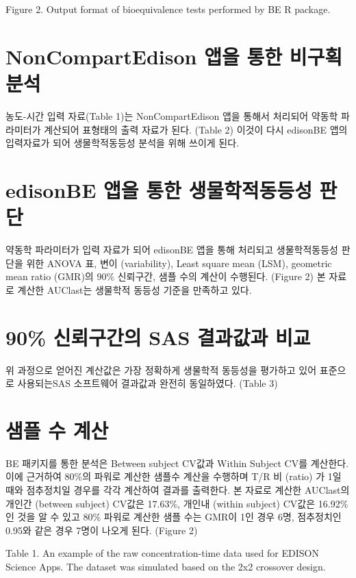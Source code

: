 \documentclass[12pt,]{krantz}
\begin{document}
Figure 2. Output format of bioequivalence tests performed by BE R package.

\hypertarget{noncompartedison---}{%
\section{NonCompartEdison 앱을 통한 비구획분석}\label{noncompartedison---}}

농도-시간 입력 자료(Table 1)는 NonCompartEdison 앱을 통해서 처리되어 약동학 파라미터가 계산되어 표형태의 출력 자료가 된다. (Table 2) 이것이 다시 edisonBE 앱의 입력자료가 되어 생물학적동등성 분석을 위해 쓰이게 된다.

\hypertarget{edisonbe----}{%
\section{edisonBE 앱을 통한 생물학적동등성 판단}\label{edisonbe----}}

약동학 파라미터가 입력 자료가 되어 edisonBE 앱을 통해 처리되고 생물학적동등성 판단을 위한 ANOVA 표, 변이 (variability), Least square mean (LSM), geometric mean ratio (GMR)의 90\% 신뢰구간, 샘플 수의 계산이 수행된다. (Figure 2) 본 자료로 계산한 AUClast는 생물학적 동등성 기준을 만족하고 있다.

\hypertarget{sas--}{%
\section{90\% 신뢰구간의 SAS 결과값과 비교}\label{sas--}}

위 과정으로 얻어진 계산값은 가장 정확하게 생물학적 동등성을 평가하고 있어 표준으로 사용되는SAS 소프트웨어 결과값과 완전히 동일하였다. (Table 3)

\hypertarget{section-3}{%
\section{샘플 수 계산}\label{section-3}}

BE 패키지를 통한 분석은 Between subject CV값과 Within Subject CV를 계산한다. 이에 근거하여 80\%의 파워로 계산한 샘플수 계산을 수행하며 T/R 비 (ratio) 가 1일 때와 점추정치일 경우를 각각 계산하여 결과를 출력한다.
본 자료로 계산한 AUClast의 개인간 (between subject) CV값은 17.63\%, 개인내 (within subject) CV값은 16.92\%인 것을 알 수 있고 80\% 파워로 계산한 샘플 수는 GMR이 1인 경우 6명, 점추정치인 0.95와 같은 경우 7명이 나오게 된다. (Figure 2)

Table 1. An example of the raw concentration-time data used for EDISON Science Apps. The dataset was simulated based on the 2x2 crossover design.
\end{document}
